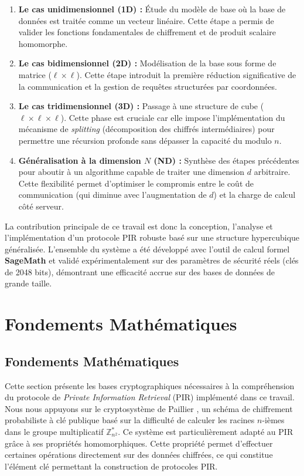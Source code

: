 \documentclass[12pt,a4paper]{report}
\begin{document}
\begin{enumerate}
    \item \textbf{Le cas unidimensionnel (1D) :} Étude du modèle de base où la base de données est traitée comme un vecteur linéaire. Cette étape a permis de valider les fonctions fondamentales de chiffrement et de produit scalaire homomorphe.
    \item \textbf{Le cas bidimensionnel (2D) :} Modélisation de la base sous forme de matrice ($\ell \times \ell$). Cette étape introduit la première réduction significative de la communication et la gestion de requêtes structurées par coordonnées.
    \item \textbf{Le cas tridimensionnel (3D) :} Passage à une structure de cube ($\ell \times \ell \times \ell$). Cette phase est cruciale car elle impose l'implémentation du mécanisme de \textit{splitting} (décomposition des chiffrés intermédiaires) pour permettre une récursion profonde sans dépasser la capacité du modulo $n$.
    \item \textbf{Généralisation à la dimension $N$ (ND) :} Synthèse des étapes précédentes pour aboutir à un algorithme capable de traiter une dimension $d$ arbitraire. Cette flexibilité permet d'optimiser le compromis entre le coût de communication (qui diminue avec l'augmentation de $d$) et la charge de calcul côté serveur.
\end{enumerate}

La contribution principale de ce travail est donc la conception, l'analyse et l'implémentation d'un protocole PIR robuste basé sur une structure hypercubique généralisée. L'ensemble du système a été développé avec l'outil de calcul formel \textbf{SageMath} et validé expérimentalement sur des paramètres de sécurité réels (clés de 2048 bits), démontrant une efficacité accrue sur des bases de données de grande taille.



\chapter{Fondements Mathématiques}



\section{Fondements Mathématiques}

Cette section présente les bases cryptographiques nécessaires à la compréhension du protocole de \textit{Private Information Retrieval} (PIR) implémenté dans ce travail.  
Nous nous appuyons sur le cryptosystème de Paillier \cite{paillier1999}, un schéma de chiffrement probabiliste à clé publique basé sur la difficulté de calculer les racines $n$-ièmes dans le groupe multiplicatif $\mathbb{Z}^*_{n^2}$. Ce système est particulièrement adapté au PIR grâce à ses propriétés homomorphiques. Cette propriété permet d’effectuer certaines opérations directement sur des données chiffrées, ce qui constitue l’élément clé permettant la construction de protocoles PIR.
\end{document}
